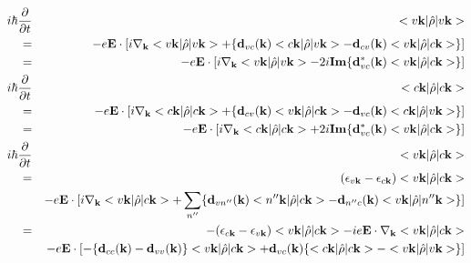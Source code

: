 \documentclass[aps,prb,preprint]{revtex4-1}
\begin{document}
\begin{appendix}
 \begin{eqnarray}
i \hbar \frac{ \partial }{\partial t } &&<v{\bf k}| \hat{\rho} |v{\bf k}> \nonumber \\
= && -e{\bf E} \cdot [  i \nabla_{\bf k} <v{\bf k}|\hat{\rho}|v{\bf k}> + \{ {\bf d}_{vc}({\bf k})<c{\bf k}|\hat{\rho}|v{\bf k}> - {\bf d}_{cv}({\bf k})<v{\bf k}|\hat{\rho}|c{\bf k}> \} ] \nonumber  \\
= && -e{\bf E} \cdot[  i \nabla_{\bf k} <v{\bf k}|\hat{\rho}|v{\bf k}> - 2i {\bf Im}\{ {\bf d}_{vc}^*({\bf k})<v{\bf k}|\hat{\rho}|c{\bf k}> \} ] \\
%
i \hbar \frac{ \partial }{\partial t } &&<c{\bf k}| \hat{\rho} |c{\bf k}> \nonumber \\
=&& -e{\bf E} \cdot [ i \nabla_{\bf k} <c{\bf k}|\hat{\rho}|c{\bf k}> + \{ {\bf d}_{cv}({\bf k})<v{\bf k}|\hat{\rho}|c{\bf k}> - {\bf d}_{vc}({\bf k})<c{\bf k}|\hat{\rho}|v{\bf k}> \} ] \nonumber  \\
=&& -e{\bf E} \cdot [ i \nabla_{\bf k} <c{\bf k}|\hat{\rho}|c{\bf k}> + 2i {\bf Im}\{ {\bf d}_{vc}^*({\bf k})<v{\bf k}|\hat{\rho}|c{\bf k}> \} ] \\
%
i \hbar \frac{ \partial }{\partial t } &&<v{\bf k}| \hat{\rho} |c{\bf k}> \nonumber \\
= && (\epsilon_{v{\bf k}}-\epsilon_{c{\bf k}}) <v{\bf k}| \hat{\rho} |c{\bf k}> \nonumber  \\
&&-e{\bf E} \cdot [  i \nabla_{\bf k} <v{\bf k}|\hat{\rho}|c{\bf k}>  + \sum_{n''}\{ {\bf d}_{vn''}({\bf k})<n''{\bf k}|\hat{\rho}|c{\bf k}> - {\bf d}_{n''c}({\bf k})<v{\bf k}|\hat{\rho}|n''{\bf k}> \} ]\nonumber  \\
= && - (\epsilon_{c{\bf k}}-\epsilon_{v{\bf k}}) <v{\bf k}| \hat{\rho} |c{\bf k}>  - i e{\bf E} \cdot \nabla_{\bf k} <v{\bf k}|\hat{\rho}|c{\bf k}> \nonumber  \\
&&-e{\bf E} \cdot [ -\{ {\bf d}_{cc}({\bf k})-{\bf d}_{vv}({\bf k}) \} <v{\bf k}|\hat{\rho}|c{\bf k}> + {\bf d}_{vc}({\bf k}) \{ <c{\bf k}|\hat{\rho}|c{\bf k}> - <v{\bf k}|\hat{\rho}|v{\bf k}>  \} ] 
\end{eqnarray}


\end{appendix}
\end{document}
